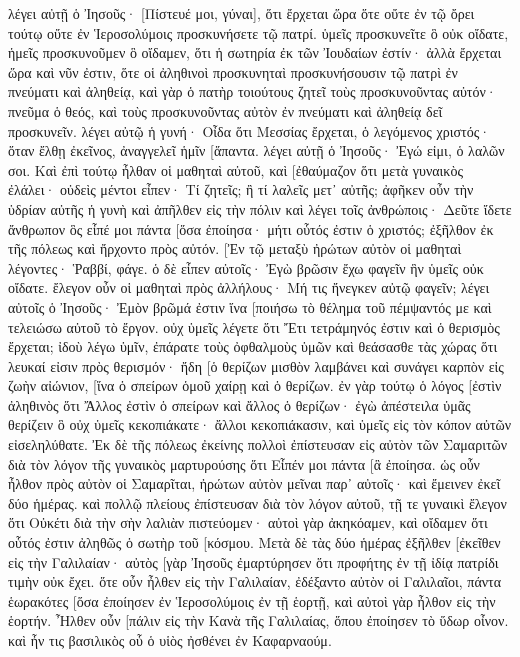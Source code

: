 λέγει αὐτῇ ὁ Ἰησοῦς· [Πίστευέ μοι, γύναι], ὅτι ἔρχεται ὥρα ὅτε οὔτε ἐν τῷ ὄρει τούτῳ οὔτε ἐν Ἱεροσολύμοις προσκυνήσετε τῷ πατρί. 
ὑμεῖς προσκυνεῖτε ὃ οὐκ οἴδατε, ἡμεῖς προσκυνοῦμεν ὃ οἴδαμεν, ὅτι ἡ σωτηρία ἐκ τῶν Ἰουδαίων ἐστίν· 
ἀλλὰ ἔρχεται ὥρα καὶ νῦν ἐστιν, ὅτε οἱ ἀληθινοὶ προσκυνηταὶ προσκυνήσουσιν τῷ πατρὶ ἐν πνεύματι καὶ ἀληθείᾳ, καὶ γὰρ ὁ πατὴρ τοιούτους ζητεῖ τοὺς προσκυνοῦντας αὐτόν· 
πνεῦμα ὁ θεός, καὶ τοὺς προσκυνοῦντας αὐτὸν ἐν πνεύματι καὶ ἀληθείᾳ δεῖ προσκυνεῖν. 
λέγει αὐτῷ ἡ γυνή· Οἶδα ὅτι Μεσσίας ἔρχεται, ὁ λεγόμενος χριστός· ὅταν ἔλθῃ ἐκεῖνος, ἀναγγελεῖ ἡμῖν [ἅπαντα. 
λέγει αὐτῇ ὁ Ἰησοῦς· Ἐγώ εἰμι, ὁ λαλῶν σοι. 
Καὶ ἐπὶ τούτῳ ἦλθαν οἱ μαθηταὶ αὐτοῦ, καὶ [ἐθαύμαζον ὅτι μετὰ γυναικὸς ἐλάλει· οὐδεὶς μέντοι εἶπεν· Τί ζητεῖς; ἢ τί λαλεῖς μετ᾽ αὐτῆς; 
ἀφῆκεν οὖν τὴν ὑδρίαν αὐτῆς ἡ γυνὴ καὶ ἀπῆλθεν εἰς τὴν πόλιν καὶ λέγει τοῖς ἀνθρώποις· 
Δεῦτε ἴδετε ἄνθρωπον ὃς εἶπέ μοι πάντα [ὅσα ἐποίησα· μήτι οὗτός ἐστιν ὁ χριστός; 
ἐξῆλθον ἐκ τῆς πόλεως καὶ ἤρχοντο πρὸς αὐτόν. 
[Ἐν τῷ μεταξὺ ἠρώτων αὐτὸν οἱ μαθηταὶ λέγοντες· Ῥαββί, φάγε. 
ὁ δὲ εἶπεν αὐτοῖς· Ἐγὼ βρῶσιν ἔχω φαγεῖν ἣν ὑμεῖς οὐκ οἴδατε. 
ἔλεγον οὖν οἱ μαθηταὶ πρὸς ἀλλήλους· Μή τις ἤνεγκεν αὐτῷ φαγεῖν; 
λέγει αὐτοῖς ὁ Ἰησοῦς· Ἐμὸν βρῶμά ἐστιν ἵνα [ποιήσω τὸ θέλημα τοῦ πέμψαντός με καὶ τελειώσω αὐτοῦ τὸ ἔργον. 
οὐχ ὑμεῖς λέγετε ὅτι Ἔτι τετράμηνός ἐστιν καὶ ὁ θερισμὸς ἔρχεται; ἰδοὺ λέγω ὑμῖν, ἐπάρατε τοὺς ὀφθαλμοὺς ὑμῶν καὶ θεάσασθε τὰς χώρας ὅτι λευκαί εἰσιν πρὸς θερισμόν· ἤδη 
[ὁ θερίζων μισθὸν λαμβάνει καὶ συνάγει καρπὸν εἰς ζωὴν αἰώνιον, [ἵνα ὁ σπείρων ὁμοῦ χαίρῃ καὶ ὁ θερίζων. 
ἐν γὰρ τούτῳ ὁ λόγος [ἐστὶν ἀληθινὸς ὅτι Ἄλλος ἐστὶν ὁ σπείρων καὶ ἄλλος ὁ θερίζων· 
ἐγὼ ἀπέστειλα ὑμᾶς θερίζειν ὃ οὐχ ὑμεῖς κεκοπιάκατε· ἄλλοι κεκοπιάκασιν, καὶ ὑμεῖς εἰς τὸν κόπον αὐτῶν εἰσεληλύθατε. 
Ἐκ δὲ τῆς πόλεως ἐκείνης πολλοὶ ἐπίστευσαν εἰς αὐτὸν τῶν Σαμαριτῶν διὰ τὸν λόγον τῆς γυναικὸς μαρτυρούσης ὅτι Εἶπέν μοι πάντα [ἃ ἐποίησα. 
ὡς οὖν ἦλθον πρὸς αὐτὸν οἱ Σαμαρῖται, ἠρώτων αὐτὸν μεῖναι παρ᾽ αὐτοῖς· καὶ ἔμεινεν ἐκεῖ δύο ἡμέρας. 
καὶ πολλῷ πλείους ἐπίστευσαν διὰ τὸν λόγον αὐτοῦ, 
τῇ τε γυναικὶ ἔλεγον ὅτι Οὐκέτι διὰ τὴν σὴν λαλιὰν πιστεύομεν· αὐτοὶ γὰρ ἀκηκόαμεν, καὶ οἴδαμεν ὅτι οὗτός ἐστιν ἀληθῶς ὁ σωτὴρ τοῦ [κόσμου. 
Μετὰ δὲ τὰς δύο ἡμέρας ἐξῆλθεν [ἐκεῖθεν εἰς τὴν Γαλιλαίαν· 
αὐτὸς [γὰρ Ἰησοῦς ἐμαρτύρησεν ὅτι προφήτης ἐν τῇ ἰδίᾳ πατρίδι τιμὴν οὐκ ἔχει. 
ὅτε οὖν ἦλθεν εἰς τὴν Γαλιλαίαν, ἐδέξαντο αὐτὸν οἱ Γαλιλαῖοι, πάντα ἑωρακότες [ὅσα ἐποίησεν ἐν Ἱεροσολύμοις ἐν τῇ ἑορτῇ, καὶ αὐτοὶ γὰρ ἦλθον εἰς τὴν ἑορτήν. 
Ἦλθεν οὖν [πάλιν εἰς τὴν Κανὰ τῆς Γαλιλαίας, ὅπου ἐποίησεν τὸ ὕδωρ οἶνον. καὶ ἦν τις βασιλικὸς οὗ ὁ υἱὸς ἠσθένει ἐν Καφαρναούμ. 
